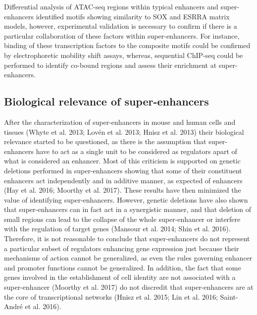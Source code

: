 Differential analysis of ATAC-seq regions within typical enhancers and super-enhancers identified motifs showing similarity to SOX and ESRRA matrix models, however, experimental validation is necessary to confirm if there is a particular collaboration of these factors within super-enhancers. For instance, binding of these transcription factors to the composite motifs could be confirmed by electrophoretic mobility shift assays, whereas, sequential ChIP-seq could be performed to identify co-bound regions and assess their enrichment at super-enhancers.\\

		\subsection{Biological relevance of super-enhancers}

After the characterization of super-enhancers in mouse and human cells and tissues (Whyte et al. 2013; Lovén et al. 2013; Hnisz et al. 2013) their biological relevance started to be questioned, as there is the assumption that super-enhancers have to act as a single unit to be considered as regulators apart of what is considered an enhancer. Most of this criticism is supported on genetic deletions performed in super-enhancers showing that some of their constituent enhancers act independently and in additive manner, as expected of enhancers (Hay et al. 2016; Moorthy et al. 2017). These results have then minimized the value of identifying super-enhancers. However, genetic deletions have also shown that super-enhancers can in fact act in a synergistic manner, and that deletion of small regions can lead to the collapse of the whole super-enhancer or interfere with the regulation of target genes (Mansour et al. 2014; Shin et al. 2016). Therefore, it is not reasonable to conclude that super-enhancers do not represent a particular subset of regulators enhancing gene expression just because their mechanisms of action cannot be generalized, as even the rules governing enhancer and promoter functions cannot be generalized. In addition, the fact that some genes involved in the establishment of cell identity are not associated with a super-enhancer (Moorthy et al. 2017) do not discredit that super-enhancers are at the core of transcriptional networks (Hnisz et al. 2015; Lin et al. 2016; Saint-André et al. 2016).\\

